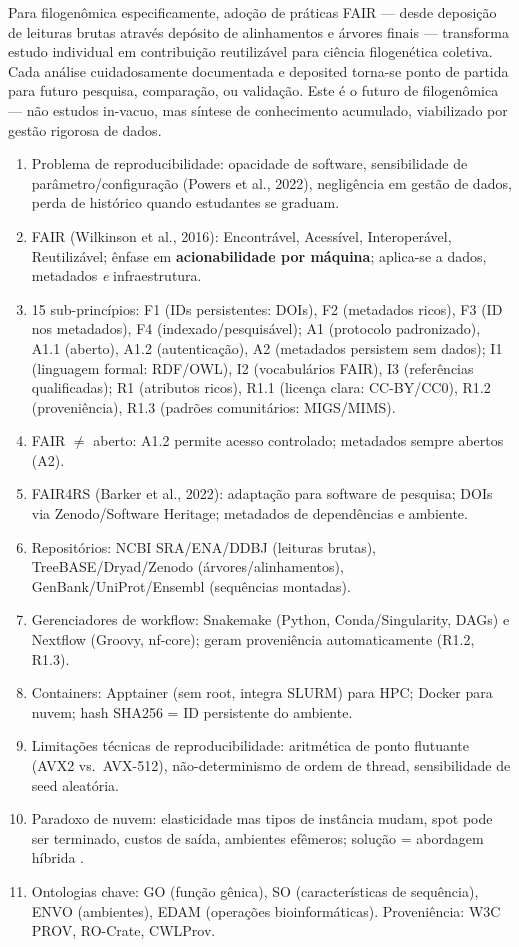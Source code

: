 Para filogenômica especificamente, adoção de práticas FAIR --- desde deposição de leituras brutas através depósito de alinhamentos e árvores finais --- transforma estudo individual em contribuição reutilizável para ciência filogenética coletiva. Cada análise cuidadosamente documentada e deposited torna-se ponto de partida para futuro pesquisa, comparação, ou validação. Este é o futuro de filogenômica --- não estudos in-vacuo, mas síntese de conhecimento acumulado, viabilizado por gestão rigorosa de dados.

\clearpage
\begin{revise}\small
\begin{enumerate}[itemsep=0pt, topsep=0pt, parsep=0pt]
    \item Problema de reproducibilidade: opacidade de software, sensibilidade de parâmetro/configuração (Powers et al., 2022), negligência em gestão de dados, perda de histórico quando estudantes se graduam.
    \item FAIR (Wilkinson et al., 2016): Encontrável, Acessível, Interoperável, Reutilizável; ênfase em \textbf{acionabilidade por máquina}; aplica-se a dados, metadados \textit{e} infraestrutura.
    \item 15 sub-princípios: F1 (IDs persistentes: DOIs), F2 (metadados ricos), F3 (ID nos metadados), F4 (indexado/pesquisável); A1 (protocolo padronizado), A1.1 (aberto), A1.2 (autenticação), A2 (metadados persistem sem dados); I1 (linguagem formal: RDF/OWL), I2 (vocabulários FAIR), I3 (referências qualificadas); R1 (atributos ricos), R1.1 (licença clara: CC-BY/CC0), R1.2 (proveniência), R1.3 (padrões comunitários: MIGS/MIMS).
    \item FAIR $\neq$ aberto: A1.2 permite acesso controlado; metadados sempre abertos (A2).
    \item FAIR4RS (Barker et al., 2022): adaptação para software de pesquisa; DOIs via Zenodo/Software Heritage; metadados de dependências e ambiente.
    \item Repositórios: NCBI SRA/ENA/DDBJ (leituras brutas), TreeBASE/Dryad/Zenodo (árvores/alinhamentos), GenBank/UniProt/Ensembl (sequências montadas).
    \item Gerenciadores de workflow: Snakemake (Python, Conda/Singularity, DAGs) e Nextflow (Groovy, nf-core); geram proveniência automaticamente (R1.2, R1.3).
    \item Containers: Apptainer (sem root, integra SLURM) para HPC; Docker para nuvem; hash SHA256 = ID persistente do ambiente.
    \item Limitações técnicas de reproducibilidade: aritmética de ponto flutuante (AVX2 vs.\ AVX-512), não-determinismo de ordem de thread, sensibilidade de seed aleatória.
    \item Paradoxo de nuvem: elasticidade mas tipos de instância mudam, spot pode ser terminado, custos de saída, ambientes efêmeros; solução = abordagem híbrida \parencite{langmead2018}.
    \item Ontologias chave: GO (função gênica), SO (características de sequência), ENVO (ambientes), EDAM (operações bioinformáticas). Proveniência: W3C PROV, RO-Crate, CWLProv.
\end{enumerate}
\end{revise}

\clearpage

\printbibliography[heading=subbibliography,title={Referências}]

